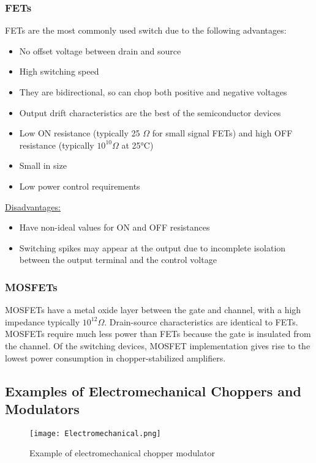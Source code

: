 \documentclass[a4paper,9pt,twoside,openany,twocolumn]{memoir}
\begin{document}
\subsubsection*{FETs}
FETs are the most commonly used switch due to the following advantages:
\begin{itemize}
    \item No offset voltage between drain and source
    \item High switching speed
    \item They are bidirectional, so can chop both positive and negative voltages
    \item Output drift characteristics are the best of the semiconductor devices
    \item Low ON resistance (typically 25 $\Omega$ for small signal FETs) and high OFF resistance (typically $10^{10} \Omega$ at 25°C)
    \item Small in size
    \item Low power control requirements
\end{itemize}

\uline{Disadvantages:}
\begin{itemize}
    \item Have non-ideal values for ON and OFF resistances
    \item Switching spikes may appear at the output due to incomplete isolation between the output terminal and the control voltage
\end{itemize}

\subsubsection*{MOSFETs}
MOSFETs have a metal oxide layer between the gate and channel, with a high impedance typically $10^{12} \Omega$. Drain-source characteristics are identical to FETs. MOSFETs require much less power than FETs because the gate is insulated from the channel. Of the switching devices, MOSFET implementation gives rise to the lowest power consumption in chopper-stabilized amplifiers.

\subsection*{Examples of Electromechanical Choppers and Modulators}

\begin{figure}[h]
    \centering
    \texttt{[image: Electromechanical.png]}
    \caption{Example of electromechanical chopper modulator}
\end{figure}
\end{document}
